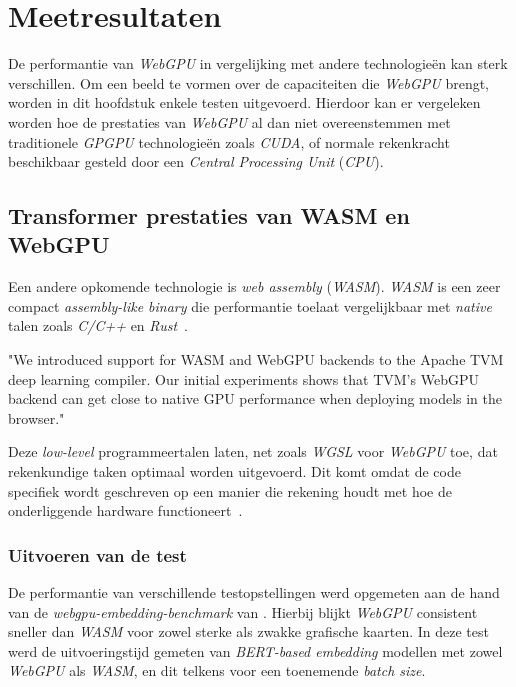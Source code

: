 \chapter{Meetresultaten}%
\label{ch:benchmarks}

De performantie van \textit{WebGPU} in vergelijking met andere technologieën kan sterk verschillen. Om een beeld te vormen over de capaciteiten die \textit{WebGPU} brengt, worden in dit hoofdstuk enkele testen uitgevoerd. Hierdoor kan er vergeleken worden hoe de prestaties van \textit{WebGPU} al dan niet overeenstemmen met traditionele \textit{GPGPU} technologieën zoals \textit{CUDA}, of normale rekenkracht beschikbaar gesteld door een \textit{Central Processing Unit} (\textit{CPU}).

\section{Transformer prestaties van WASM en WebGPU}

Een andere opkomende technologie is \textit{web assembly} (\textit{WASM}). \textit{WASM} is een zeer compact \textit{assembly-like binary} die performantie toelaat vergelijkbaar met \textit{native} talen zoals \textit{C/C++} en \textit{Rust}~\autocite{Steiner2023}.

\begin{displayquote}
    "We introduced support for WASM and WebGPU backends to the Apache TVM deep learning compiler. Our initial experiments shows that TVM's WebGPU backend can get close to native GPU performance when deploying models in the browser."
\end{displayquote}

Deze \textit{low-level} programmeertalen laten, net zoals \textit{WGSL} voor \textit{WebGPU} toe, dat rekenkundige taken optimaal worden uitgevoerd. Dit komt omdat de code specifiek wordt geschreven op een manier die rekening houdt met hoe de onderliggende hardware functioneert~\autocite{Knight2020}.

\begin{figure}
    \centering
    
\end{figure}
\label{sec:transformerbench}

\subsection{Uitvoeren van de test}

De performantie van verschillende testopstellingen werd opgemeten aan de hand van de \textit{webgpu-embedding-benchmark} van \textcite{Lochner2024}. Hierbij blijkt \textit{WebGPU} consistent sneller dan \textit{WASM} voor zowel sterke als zwakke grafische kaarten. In deze test werd de uitvoeringstijd gemeten van \textit{BERT-based embedding} modellen met zowel \textit{WebGPU} als \textit{WASM}, en dit telkens voor een toenemende \textit{batch size}.

